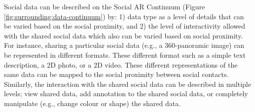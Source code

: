 



Social data can be described on the Social AR Continuum (Figure \ref{fig:surrounding:data-continuum}) by: 1) data type as a level of details that can be varied based on the social proximity, and 2) the level of interactivity allowed with the shared social data which also can be varied based on social proximity. For instance, sharing a particular social data (e.g., a 360-panoramic image) can be represented in different formats. These different format such as a simple text description, a 2D photo, or a 2D video. These different representations of the same data can be mapped to the social proximity between social contacts. Similarly, the interaction with the shared social data can be described in multiple levels; view shared data, add annotation to the shared social data, or completely manipulate (e.g., change colour or shape) the shared data. 

